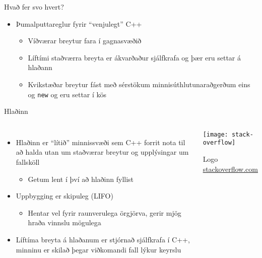 \documentclass{beamer}
\begin{document}
\begin{frame}{Hvað fer svo hvert?}
    \begin{itemize}
        \item Þumalputtareglur fyrir ``venjulegt'' C++
        \begin{itemize}
            \item Víðværar  breytur fara í gagnasvæðið
            \item Líftími staðværra  breyta er ákvarðaður sjálfkrafa og þær eru settar á hlaðann
            \item Kvikstæðar breytur fást með sérstökum minnisúthlutunaraðgerðum eins og \texttt{new} og eru settar í kös
        \end{itemize}
    \end{itemize}
\end{frame}

\begin{frame}{Hlaðinn}
    \begin{columns}
        \begin{itemize}
            \item Hlaðinn er ``lítið'' minnissvæði sem C++ forrit nota til að halda utan um staðværar breytur og upplýsingar um fallsköll
            \begin{itemize}
                \item Getum lent í því að hlaðinn fyllist
            \end{itemize}
            \item Uppbygging er skipuleg (LIFO)
            \begin{itemize}
                \item Hentar vel fyrir raunverulega örgjörva, gerir mjög hraða vinnslu mögulega
            \end{itemize}
            \item Líftíma breyta á hlaðanum er stjórnað sjálfkrafa í C++, minninu er skilað þegar viðkomandi fall lýkur keyrslu
        \end{itemize}
        \pause
        \begin{center}
            \texttt{[image: stack-overflow]}

            Logo \href{https://stackoverflow.com/}{stackoverflow.com}
        \end{center}
    \end{columns}
\end{frame}
\end{document}
